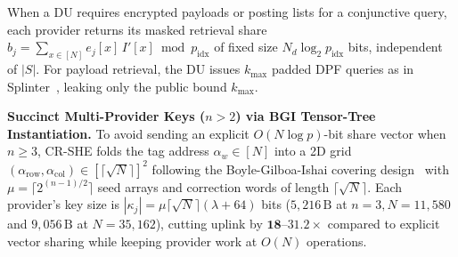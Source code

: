 \documentclass[11pt,a4paper]{article}
\begin{document}
When a DU requires encrypted payloads or posting lists for a conjunctive query, each provider returns its masked retrieval share $b_j = \sum_{x \in [N]} e_j[x]\, I'[x] \bmod p_{\mathrm{idx}}$ of fixed size $N_d \log_2 p_{\mathrm{idx}}$ bits, independent of $|S|$. For payload retrieval, the DU issues $k_{\max}$ padded DPF queries as in Splinter~\cite{wang2017}, leaking only the public bound $k_{\max}$.

\textbf{Succinct Multi-Provider Keys ($n > 2$) via BGI Tensor-Tree Instantiation.} To avoid sending an explicit $O(N \log p)$-bit share vector when $n \ge 3$, CR-SHE folds the tag address $\alpha_w \in [N]$ into a 2D grid $(\alpha_{\mathrm{row}}, \alpha_{\mathrm{col}}) \in [\lceil\sqrt{N}\rceil]^2$ following the Boyle-Gilboa-Ishai covering design~\cite{boyle2015} with $\mu = \lceil 2^{(n-1)/2}\rceil$ seed arrays and correction words of length $\lceil\sqrt{N}\rceil$. Each provider's key size is $|\kappa_j| = \mu \lceil\sqrt{N}\rceil(\lambda + 64)$ bits ($5{,}216\,\text{B}$ at $n=3, N=11{,}580$ and $9{,}056\,\text{B}$ at $N=35{,}162$), cutting uplink by $\mathbf{18\text{--}31.2\times}$ compared to explicit vector sharing while keeping provider work at $O(N)$ operations.
\end{document}
